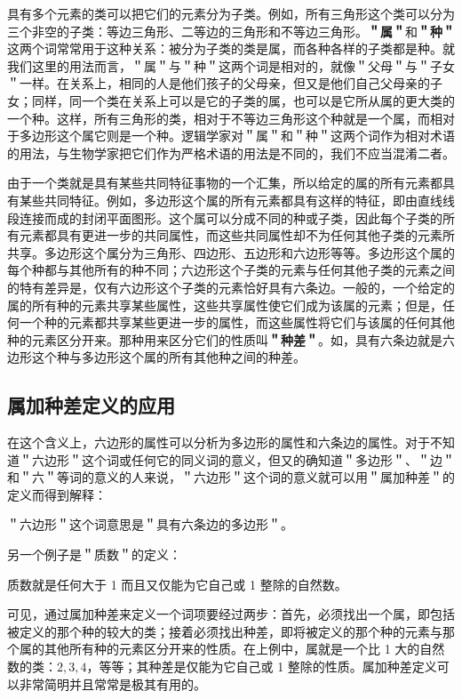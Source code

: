 具有多个元素的类可以把它们的元素分为子类。例如，所有三角形这个类可以分为三个非空的子类：等边三角形、二等边的三角形和不等边三角形。\textbf{＂属＂}和\textbf{＂种＂}这两个词常常用于这种关系：被分为子类的类是属，而各种各样的子类都是种。就我们这里的用法而言，＂属＂与＂种＂这两个词是相对的，就像＂父母＂与＂子女＂一样。在关系上，相同的人是他们孩子的父母亲，但又是他们自己父母亲的子女；同样，同一个类在关系上可以是它的子类的属，也可以是它所从属的更大类的一个种。这样，所有三角形的类，相对于不等边三角形这个种就是一个属，而相对于多边形这个属它则是一个种。逻辑学家对＂属＂和＂种＂这两个词作为相对术语的用法，与生物学家把它们作为严格术语的用法是不同的，我们不应当混淆二者。

由于一个类就是具有某些共同特征事物的一个汇集，所以给定的属的所有元素都具有某些共同特征。例如，多边形这个属的所有元素都具有这样的特征，即由直线线段连接而成的封闭平面图形。这个属可以分成不同的种或子类，因此每个子类的所有元素都具有更进一步的共同属性，而这些共同属性却不为任何其他子类的元素所共享。多边形这个属分为三角形、四边形、五边形和六边形等等。多边形这个属的每个种都与其他所有的种不同；六边形这个子类的元素与任何其他子类的元素之间的特有差异是，仅有六边形这个子类的元素恰好具有六条边。一般的，一个给定的属的所有种的元素共享某些属性，这些共享属性使它们成为该属的元素；但是，任何一个种的元素都共享某些更进一步的属性，而这些属性将它们与该属的任何其他种的元素区分开来。那种用来区分它们的性质叫\textbf{＂种差＂}。如，具有六条边就是六边形这个种与多边形这个属的所有其他种之间的种差。

\subsection{属加种差定义的应用}

在这个含义上，六边形的属性可以分析为多边形的属性和六条边的属性。对于不知道＂六边形＂这个词或任何它的同义词的意义，但又的确知道＂多边形＂、＂边＂和＂六＂等词的意义的人来说，＂六边形＂这个词的意义就可以用＂属加种差＂的定义而得到解释：

\begin{displayquote}
＂六边形＂这个词意思是＂具有六条边的多边形＂。
\end{displayquote}

另一个例子是＂质数＂的定义：

\begin{displayquote}
质数就是任何大于 1 而且又仅能为它自己或 1 整除的自然数。
\end{displayquote}

可见，通过属加种差来定义一个词项要经过两步：首先，必须找出一个属，即包括被定义的那个种的较大的类；接着必须找出种差，即将被定义的那个种的元素与那个属的其他所有种的元素区分开来的性质。在上例中，属就是一个比 1 大的自然数的类：$2,3,4$，等等；其种差是仅能为它自己或 1 整除的性质。属加种差定义可以非常简明并且常常是极其有用的。

